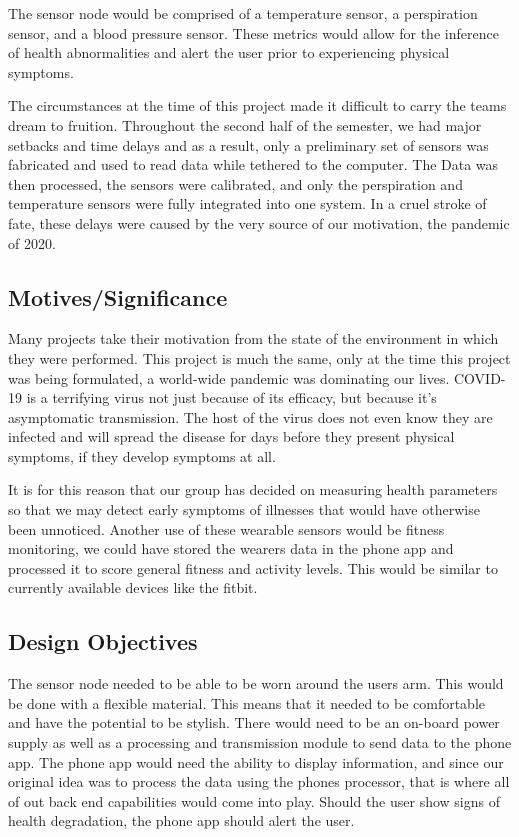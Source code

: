 \documentclass[12pt,a4paper]{report}
\begin{document}
The sensor node would be comprised of a temperature sensor, a perspiration sensor, and a blood pressure sensor. These metrics would allow for the inference of health abnormalities and alert the user prior to experiencing physical symptoms.\par

The circumstances at the time of this project made it difficult to carry the teams dream to fruition. Throughout the second half of the semester, we had major setbacks and time delays and as a result, only a preliminary set of sensors was fabricated and used to read data while tethered to the computer. The Data was then processed, the sensors were calibrated, and only the perspiration and temperature sensors were fully integrated into one system. In a cruel stroke of fate, these delays were caused by the very source of our motivation, the pandemic of 2020.

\subsection{Motives/Significance}

Many projects take their motivation from the state of the environment in which they were performed. This project is much the same, only at the time this project was being formulated, a world-wide pandemic was dominating our lives. COVID-19 is a terrifying virus not just because of its efficacy, but because it's asymptomatic transmission. The host of the virus does not even know they are infected and will spread the disease for days before they present physical symptoms, if they develop symptoms at all. \par

It is for this reason that our group has decided on measuring health parameters so that we may detect early symptoms of illnesses that would have otherwise been unnoticed. Another use of these wearable sensors would be fitness monitoring, we could have stored the wearers data in the phone app and processed it to score general fitness and activity levels. This would be similar to currently available devices like the fitbit.

\subsection{Design Objectives}

The sensor node needed to be able to be worn around the users arm. This would be done with a flexible material. This means that it needed to be comfortable and have the potential to be stylish. There would need to be an on-board power supply as well as a processing and transmission module to send data to the phone app. The phone app would need the ability to display information, and since our original idea was to process the data using the phones processor, that is where all of out back end capabilities would come into play. Should the user show signs of health degradation, the phone app should alert the user.
\end{document}
